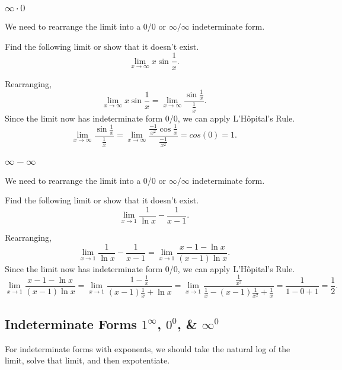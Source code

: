 \subsubsection{$\infty\cdot 0$}
We need to rearrange the limit into a 0/0 or $\infty/\infty$ indeterminate form.
\begin{example}
	Find the following limit or show that it doesn't exist.
	\begin{equation*}
		\lim_{x\to\infty}{x\sin{\frac{1}{x}}}.
	\end{equation*}
\end{example}
Rearranging,
\begin{equation*}
	\lim_{x\to\infty}{x\sin{\frac{1}{x}}} = \lim_{x\to\infty}\frac{\sin{\frac{1}{x}}}{\frac{1}{x}}.
\end{equation*}
\indent
Since the limit now has indeterminate form 0/0, we can apply L'H\^{o}pital's Rule.
\begin{equation*}
	\lim_{x\to\infty}\frac{\sin{\frac{1}{x}}}{\frac{1}{x}} = \lim_{x\to\infty}\frac{\frac{-1}{x^2}\cos{\frac{1}{x}}}{\frac{-1}{x^2}} = cos(0) = 1.
\end{equation*}

\subsubsection{$\infty - \infty$}
We need to rearrange the limit into a 0/0 or $\infty/\infty$ indeterminate form.
\begin{example}
	Find the following limit or show that it doesn't exist.
	\begin{equation*}
		\lim_{x\to 1}{\frac{1}{\ln{x}} - \frac{1}{x-1}}.
	\end{equation*}
\end{example}
Rearranging,
\begin{equation*}
	\lim_{x\to 1}{\frac{1}{\ln{x}} - \frac{1}{x-1}} = \lim_{x\to 1}{\frac{x-1-\ln{x}}{(x-1)\ln{x}}}.
\end{equation*}
Since the limit now has indeterminate form 0/0, we can apply L'H\^{o}pital's Rule.
\begin{equation*}
	\lim_{x\to 1}{\frac{x-1-\ln{x}}{(x-1)\ln{x}}} = \lim_{x\to 1}{\frac{1-\frac{1}{x}}{(x-1)\frac{1}{x} + \ln{x}}} = \lim_{x\to 1}{\frac{\frac{1}{x^2}}{\frac{1}{x} - (x-1)\frac{1}{x^2} + \frac{1}{x}}} = \frac{1}{1-0+1} = \frac{1}{2}.
\end{equation*}

\subsection{Indeterminate Forms $1^\infty$, $0^0$, \& $\infty^0$}
For indeterminate forms with exponents, we should take the natural log of the limit, solve that limit, and then expotentiate.

